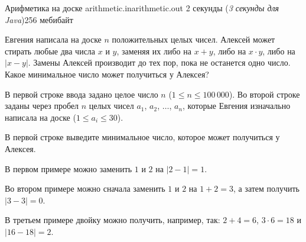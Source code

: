 \gdef\thisproblemauthor{Иван Казменко}
\gdef\thisproblemdeveloper{Иван Казменко}
\gdef\thisproblemorigin{\texttt{XXXIII} Чемпионат СПбГУ}
\begin{problem}{Арифметика на доске}
{arithmetic.in}{arithmetic.out}
{2 секунды (\textsl{3 секунды для Java})}{256 мебибайт}{}

Евгения написала на доске $n$ положительных целых чисел.
Алексей может стирать любые два числа $x$ и $y$,
заменяя их либо на $x + y$, либо на $x \cdot y$, либо на $|x - y|$.
Замены Алексей производит до тех пор, пока не останется одно число.
Какое минимальное число может получиться у Алексея?

\InputFile

В первой строке ввода задано целое число $n$
($1 \le n \le 100\,000$).
Во второй строке заданы через пробел $n$ целых чисел
$a_1$, $a_2$, $\ldots$, $a_n$, которые Евгения изначально написала на доске
($1 \le a_i \le 30$).

\OutputFile

В первой строке выведите минимальное число, которое может получиться у Алексея.

\Examples

\begin{example}
%
%
%
\end{example}

\Explanations

В первом примере можно заменить $1$ и $2$ на $|2 - 1| = 1$.

Во втором примере можно сначала заменить $1$ и $2$ на $1 + 2 = 3$,
а затем получить $|3 - 3| = 0$.

В третьем примере двойку можно получить, например, так:
$2 + 4 = 6$, $3 \cdot 6 = 18$ и $|16 - 18| = 2$.

\end{problem}
